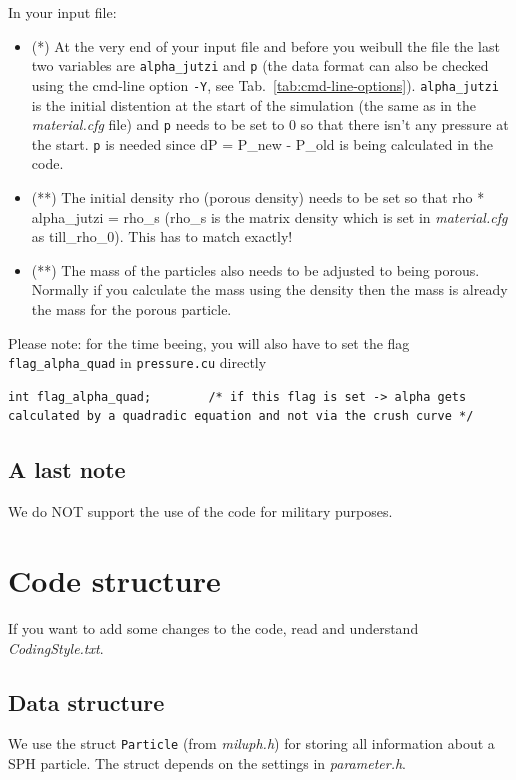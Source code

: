 \documentclass[10pt,fleqn,twoside]{article}
\begin{document}
In your input file:
\begin{itemize}
\item (*) At the very end of your input file and before you weibull the file the last two variables are \verb|alpha_jutzi| and \verb|p| (the data format can also be checked using the cmd-line option \verb|-Y|, see Tab.~\ref{tab:cmd-line-options}). \verb|alpha_jutzi| is the initial distention at the start of the simulation (the same as in the \emph{material.cfg} file) and \verb|p| needs to be set to 0 so that there isn't any pressure at the start. \verb|p| is needed since dP = P\_new - P\_old is being calculated in the code.
\item (**) The initial density rho (porous density) needs to be set so that rho * alpha\_jutzi = rho\_s (rho\_s is the matrix density which is set in \emph{material.cfg} as till\_rho\_0). This has to match exactly!
\item (**) The mass of the particles also needs to be adjusted to being porous. Normally if you calculate the mass using the density then the mass is already the mass for the porous particle.
\end{itemize}
Please note: for the time beeing, you will also have to set the flag \texttt{flag\_alpha\_quad} in \texttt{pressure.cu} directly
\begin{lstlisting}
int flag_alpha_quad;        /* if this flag is set -> alpha gets calculated by a quadradic equation and not via the crush curve */
\end{lstlisting}


\subsection{A last note}
We do NOT support the use of the code for military purposes.




\section{Code structure}
If you want to add some changes to the code, read and understand \emph{CodingStyle.txt}.

\subsection{Data structure}
We use the struct \verb|Particle| (from \emph{miluph.h}) for storing all information about a SPH particle. The struct depends on the
settings in \emph{parameter.h}.
\end{document}
